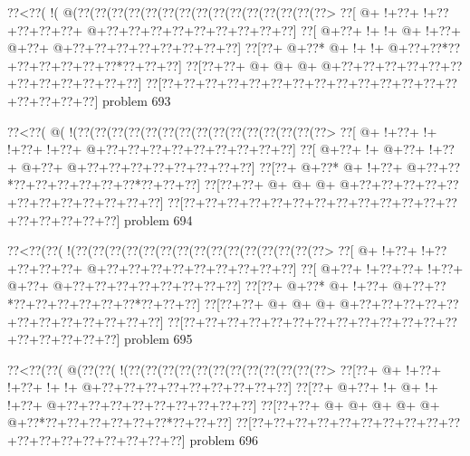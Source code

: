 \vbox{\vbox{\goo
\0??<\0??(\- !(\- @(\0??(\0??(\0??(\0??(\0??(\0??(\0??(\0??(\0??(\0??(\0??(\0??(\0??(\0??(\0??>
\0??[\- @+\- !+\0??+\- !+\0??+\0??+\0??+\0??+\- @+\0??+\0??+\0??+\0??+\0??+\0??+\0??+\0??+\0??]
\0??[\- @+\0??+\- !+\- !+\- @+\- !+\0??+\- @+\0??+\- @+\0??+\0??+\0??+\0??+\0??+\0??+\0??+\0??]
\0??[\0??+\- @+\0??*\- @+\- !+\- !+\- @+\0??+\0??*\0??+\0??+\0??+\0??+\0??+\0??*\0??+\0??+\0??]
\0??[\0??+\0??+\- @+\- @+\- @+\- @+\0??+\0??+\0??+\0??+\0??+\0??+\0??+\0??+\0??+\0??+\0??+\0??]
\0??[\0??+\0??+\0??+\0??+\0??+\0??+\0??+\0??+\0??+\0??+\0??+\0??+\0??+\0??+\0??+\0??+\0??+\0??]
}
\hfil problem 693\hfil\break
}



\vbox{\vbox{\goo
\0??<\0??(\- @(\- !(\0??(\0??(\0??(\0??(\0??(\0??(\0??(\0??(\0??(\0??(\0??(\0??(\0??(\0??(\0??>
\0??[\- @+\- !+\0??+\- !+\- !+\0??+\- !+\0??+\- @+\0??+\0??+\0??+\0??+\0??+\0??+\0??+\0??+\0??]
\0??[\- @+\0??+\- !+\- @+\0??+\- !+\0??+\- @+\0??+\- @+\0??+\0??+\0??+\0??+\0??+\0??+\0??+\0??]
\0??[\0??+\- @+\0??*\- @+\- !+\0??+\- @+\0??+\0??*\0??+\0??+\0??+\0??+\0??+\0??*\0??+\0??+\0??]
\0??[\0??+\0??+\- @+\- @+\- @+\- @+\0??+\0??+\0??+\0??+\0??+\0??+\0??+\0??+\0??+\0??+\0??+\0??]
\0??[\0??+\0??+\0??+\0??+\0??+\0??+\0??+\0??+\0??+\0??+\0??+\0??+\0??+\0??+\0??+\0??+\0??+\0??]
}
\hfil problem 694\hfil\break
}



\vbox{\vbox{\goo
\0??<\0??(\0??(\- !(\0??(\0??(\0??(\0??(\0??(\0??(\0??(\0??(\0??(\0??(\0??(\0??(\0??(\0??(\0??>
\0??[\- @+\- !+\0??+\- !+\0??+\0??+\0??+\0??+\- @+\0??+\0??+\0??+\0??+\0??+\0??+\0??+\0??+\0??]
\0??[\- @+\0??+\- !+\0??+\0??+\- !+\0??+\- @+\0??+\- @+\0??+\0??+\0??+\0??+\0??+\0??+\0??+\0??]
\0??[\0??+\- @+\0??*\- @+\- !+\0??+\- @+\0??+\0??*\0??+\0??+\0??+\0??+\0??+\0??*\0??+\0??+\0??]
\0??[\0??+\0??+\- @+\- @+\- @+\- @+\0??+\0??+\0??+\0??+\0??+\0??+\0??+\0??+\0??+\0??+\0??+\0??]
\0??[\0??+\0??+\0??+\0??+\0??+\0??+\0??+\0??+\0??+\0??+\0??+\0??+\0??+\0??+\0??+\0??+\0??+\0??]
}
\hfil problem 695\hfil\break
}



\vbox{\vbox{\goo
\0??<\0??(\0??(\- @(\0??(\0??(\- !(\0??(\0??(\0??(\0??(\0??(\0??(\0??(\0??(\0??(\0??(\0??(\0??>
\0??[\0??+\- @+\- !+\0??+\- !+\0??+\- !+\- !+\- @+\0??+\0??+\0??+\0??+\0??+\0??+\0??+\0??+\0??]
\0??[\0??+\- @+\0??+\- !+\- @+\- !+\- !+\0??+\- @+\0??+\0??+\0??+\0??+\0??+\0??+\0??+\0??+\0??]
\0??[\0??+\0??+\- @+\- @+\- @+\- @+\- @+\- @+\0??*\0??+\0??+\0??+\0??+\0??+\0??*\0??+\0??+\0??]
\0??[\0??+\0??+\0??+\0??+\0??+\0??+\0??+\0??+\0??+\0??+\0??+\0??+\0??+\0??+\0??+\0??+\0??+\0??]
}
\hfil problem 696\hfil\break
}



